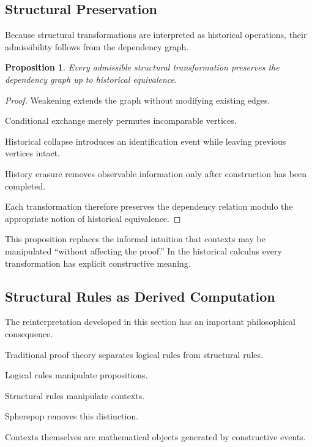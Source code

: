 \documentclass[12pt,oneside]{article}
\newtheorem{proposition}[theorem]{Proposition}
\theoremstyle{definition}
\theoremstyle{remark}
\begin{document}
\subsection{Structural Preservation}

Because structural transformations are interpreted as historical operations,
their admissibility follows from the dependency graph.

\begin{proposition}

Every admissible structural transformation preserves the dependency graph up to
historical equivalence.

\end{proposition}

\begin{proof}

Weakening extends the graph without modifying existing edges.

Conditional exchange merely permutes incomparable vertices.

Historical collapse introduces an identification event while leaving previous
vertices intact.

History erasure removes observable information only after construction has been
completed.

Each transformation therefore preserves the dependency relation modulo the
appropriate notion of historical equivalence.

\end{proof}

This proposition replaces the informal intuition that contexts may be
manipulated ``without affecting the proof.'' In the historical calculus every
transformation has explicit constructive meaning.

\subsection{Structural Rules as Derived Computation}

The reinterpretation developed in this section has an important philosophical
consequence.

Traditional proof theory separates logical rules from structural rules.

Logical rules manipulate propositions.

Structural rules manipulate contexts.

Spherepop removes this distinction.

Contexts themselves are mathematical objects generated by constructive events.
\end{document}
